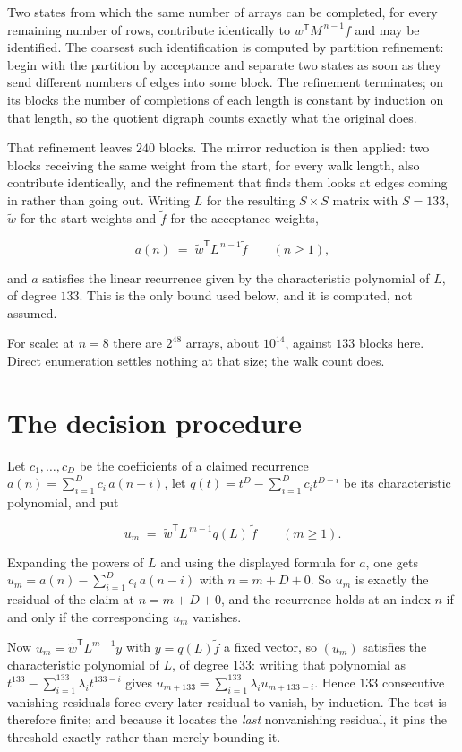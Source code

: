 \documentclass[11pt]{article}
\theoremstyle{definition}
\begin{document}
Two states from which the same number of arrays can be completed, for every remaining number of rows, contribute identically to $w^{\mathsf T}M^{\,n-1}f$ and may be identified. The coarsest such identification is computed by partition refinement: begin with the partition by acceptance and separate two states as soon as they send different numbers of edges into some block. The refinement terminates; on its blocks the number of completions of each length is constant by induction on that length, so the quotient digraph counts exactly what the original does.

That refinement leaves $240$ blocks. The mirror reduction is then applied: two blocks receiving the same weight from the start, for every walk length, also contribute identically, and the refinement that finds them looks at edges coming in rather than going out. Writing $L$ for the resulting $S \times S$ matrix with $S = 133$, $\tilde w$ for the start weights and $\tilde f$ for the acceptance weights,

\[a(n) \;=\; \tilde w^{\mathsf T} L^{\,n-1} \tilde f \qquad (n \ge 1),\]

and $a$ satisfies the linear recurrence given by the characteristic polynomial of $L$, of degree $133$. This is the only bound used below, and it is computed, not assumed.

For scale: at $n = 8$ there are $2^{48}$ arrays, about $10^{14}$, against $133$ blocks here. Direct enumeration settles nothing at that size; the walk count does.

\section{The decision procedure}

Let $c_1,\dots,c_D$ be the coefficients of a claimed recurrence $a(n) = \sum_{i=1}^{D} c_i\,a(n-i)$, let $q(t) = t^{D} - \sum_{i=1}^{D} c_i t^{D-i}$ be its characteristic polynomial, and put

\[u_m \;=\; \tilde w^{\mathsf T} L^{\,m-1} q(L)\,\tilde f \qquad (m \ge 1).\]

Expanding the powers of $L$ and using the displayed formula for $a$, one gets $u_m = a(n) - \sum_{i=1}^{D} c_i\,a(n-i)$ with $n = m + D + 0$. So $u_m$ is exactly the residual of the claim at $n = m + D + 0$, and the recurrence holds at an index $n$ if and only if the corresponding $u_m$ vanishes.

Now $u_m = \tilde w^{\mathsf T} L^{m-1} y$ with $y = q(L)\tilde f$ a fixed vector, so $(u_m)$ satisfies the characteristic polynomial of $L$, of degree $133$: writing that polynomial as $t^{133} - \sum_{i=1}^{133} \lambda_i t^{133-i}$ gives $u_{m+133} = \sum_{i=1}^{133} \lambda_i u_{m+133-i}$. Hence $133$ consecutive vanishing residuals force every later residual to vanish, by induction. The test is therefore finite; and because it locates the {\itshape last} nonvanishing residual, it pins the threshold exactly rather than merely bounding it.
\end{document}
